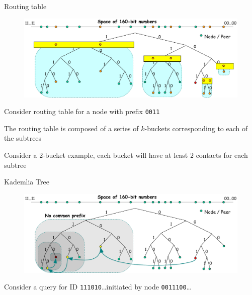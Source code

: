 \begin{frame}[t]{Routing table}

\begin{figure}
	\includegraphics[width=\textwidth]{kad4}
\end{figure}

\BI
\item Consider routing table for a node with prefix \texttt{0011}
\item The routing table is composed of a series of \alert{$k$-buckets} corresponding to each of the subtrees
\item Consider a $2$-bucket example, each bucket will have at least $2$ contacts for each subtree
\EI

\end{frame}

\begin{frame}[t]{Kademlia Tree}

\begin{figure}
	\includegraphics[width=\textwidth]{kad3}
\end{figure}

\BI
\item Consider a query for ID \texttt{\alert{1110}10}\ldots initiated by node \texttt{\alert{0011}100}\ldots
\EI

\end{frame}

